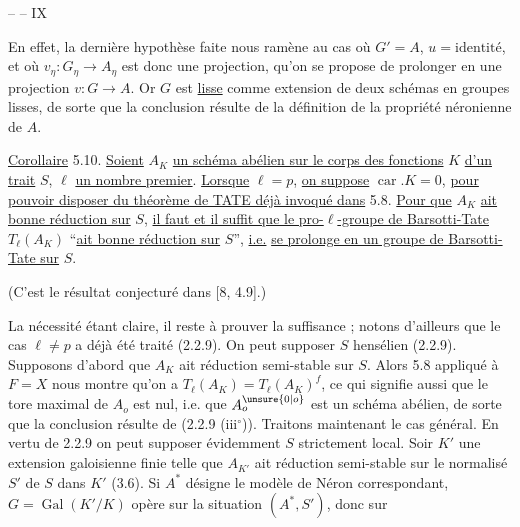 \hfill --  -- \hfill IX

En effet, la dernière hypothèse faite nous ramène au cas où $G'=A$, $u=\text{identité}$, et où $v_\eta:G_\eta\longrightarrow A_\eta$ est donc une projection, qu'on se propose de prolonger en une projection $v:G\longrightarrow A$. Or $G$ est \uline{lisse} comme extension de deux schémas en groupes lisses, de sorte que la conclusion résulte de la définition de la propriété néronienne de $A$.

\uline{Corollaire} 5.10. \uline{Soient} $A_K$ \uline{un schéma abélien sur le corps des fonctions} $K$ \uline{d'un trait} $S$, $\ell$ \uline{un nombre premier}. \uline{Lorsque} $\ell=p$, \uline{on suppose} $\operatorname{car}.K=0$, \uline{pour pouvoir disposer du théorème de TATE déjà invoqué dans} 5.8. \uline{Pour que} $A_K$ \uline{ait bonne réduction sur} $S$, \uline{il faut et il suffit que le pro-$\ell$-groupe de Barsotti-Tate} $T_\ell(A_K)$ ``\uline{ait bonne réduction sur} $S$'', \uline{i.e.} \uline{se prolonge en un groupe de Barsotti-Tate sur} $S$.

(C'est le résultat conjecturé dans [8, 4.9].)

La nécessité étant claire, il reste à prouver la suffisance ; notons d'ailleurs que le cas $\ell\neq p$ a déjà été traité (2.2.9). On peut supposer $S$ hensélien (2.2.9). Supposons d'abord que $A_K$ ait réduction semi-stable sur $S$. Alors 5.8 appliqué à $F=X$ nous montre qu'on a $T_\ell(A_K)=T_\ell(A_K)^f$, ce qui signifie aussi que le tore maximal de $A_o$ est nul, i.e. que $A_o^{\unsure{0|o}}$ est un schéma abélien, de sorte que la conclusion résulte de (2.2.9 (iii$^\circ$)). Traitons maintenant le cas général. En vertu de 2.2.9 on peut supposer évidemment $S$ strictement local. Soir $K'$ une extension galoisienne finie telle que $A_{K'}$ ait réduction semi-stable sur le normalisé $S'$ de $S$ dans $K'$ (3.6). Si $A^*$ désigne le modèle de Néron correspondant, $G=\operatorname{Gal}(K'/K)$ opère sur la situation $(A^*,S')$, donc sur
